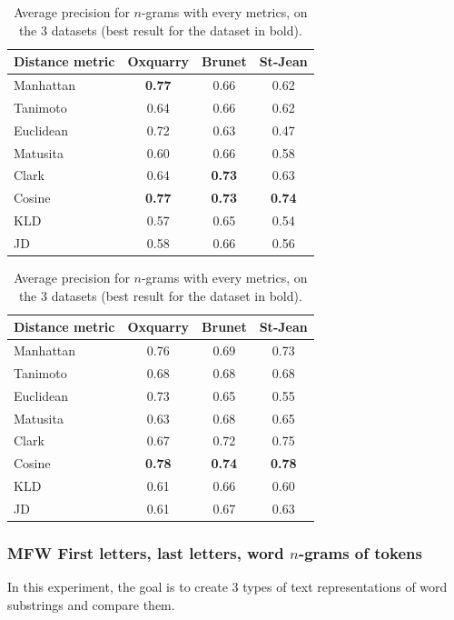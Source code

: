 \begin{table}
  \centering
  \caption{Average precision for $n$-grams with every metrics, on the 3 datasets (best result for the dataset in bold).}
  \label{tab:letter_ngrams}

  \begin{tabular}{l c c c}
    \toprule
    Distance metric & Oxquarry & Brunet & St-Jean \\
    \midrule
    Manhattan & \textbf{0.77} & 0.66 & 0.62 \\
    Tanimoto & 0.64 & 0.66 & 0.62 \\
    Euclidean & 0.72 & 0.63 & 0.47 \\
    Matusita & 0.60 & 0.66 & 0.58 \\
    Clark & 0.64 & \textbf{0.73} & 0.63 \\
    Cosine & \textbf{0.77} & \textbf{0.73} & \textbf{0.74} \\
    KLD & 0.57 & 0.65 & 0.54 \\
    JD & 0.58 & 0.66 & 0.56 \\
    \bottomrule
  \end{tabular}

  \begin{tabular}{l c c c}
    \toprule
    Distance metric & Oxquarry & Brunet & St-Jean \\
    \midrule
    Manhattan & 0.76 & 0.69 & 0.73 \\
    Tanimoto & 0.68 & 0.68 & 0.68 \\
    Euclidean & 0.73 & 0.65 & 0.55 \\
    Matusita & 0.63 & 0.68 & 0.65 \\
    Clark & 0.67 & 0.72 & 0.75 \\
    Cosine & \textbf{0.78} & \textbf{0.74} & \textbf{0.78} \\
    KLD & 0.61 & 0.66 & 0.60 \\
    JD & 0.61 & 0.67 & 0.63 \\
    \bottomrule
  \end{tabular}
\end{table}


\subsubsection{MFW First letters, last letters, word $n$-grams of tokens}

In this experiment, the goal is to create 3 types of text representations of word substrings and compare them.

